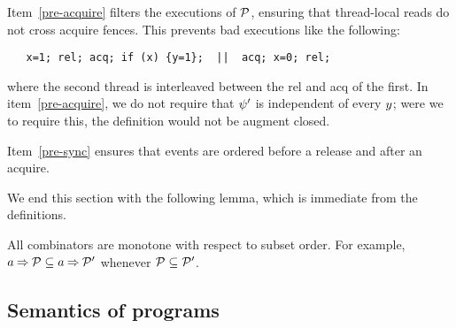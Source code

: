 

Item~\ref{pre-acquire} filters the executions of $\mathcal{P}$, ensuring that
thread-local reads do not cross acquire fences.  This prevents bad executions
like the following:
\begin{verbatim}
   x=1; rel; acq; if (x) {y=1};  ||  acq; x=0; rel; 
\end{verbatim}
where the second thread is interleaved between the rel and acq of the first.
In item~\ref{pre-acquire}, we do not require that $\psi'$ is independent of
every $y$; were we to require this, the definition would not be augment closed.

Item~\ref{pre-sync} ensures that events are ordered before a release and
after an acquire.

We end this section with the following lemma, which is immediate from the definitions.
\begin{lemma}
  \label{lem:monotone}
  All combinators are monotone with respect to subset order.  For example, 
  $a\mathbin\Rightarrow\mathcal{P} \subseteq a\mathbin\Rightarrow\mathcal{P}'$ whenever
  $\mathcal{P}\subseteq\mathcal{P}'$.
\end{lemma}

\subsection{Semantics of programs}
\label{sec:semantics}


